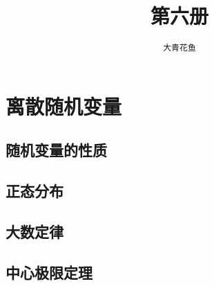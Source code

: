 \documentclass[12pt,UTF8]{ctexbook}
\title{\zihao{0} \bfseries 第六册}
\author{\zihao{2} \texttt{大青花鱼}}
\date{}
\begin{document}
\maketitle
\tableofcontents
\newpage



\chapter{离散随机变量}

\section{随机变量的性质}

\section{正态分布}

\section{大数定律}

\section{中心极限定理}
\end{document}
